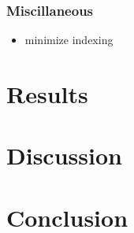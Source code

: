 \documentclass{article}
\begin{document}
        \subsubsection{Miscillaneous}

            \begin{itemize}
                \item minimize indexing
            \end{itemize}

\section{Results}

\section{Discussion}

\section{Conclusion}

\nocite{*}
\printbibliography
\end{document}
